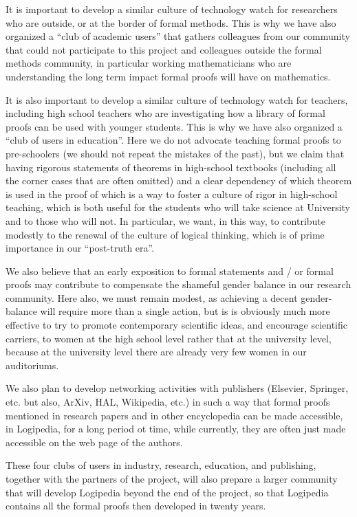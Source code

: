 It is important to develop a similar culture of technology watch for
researchers who are outside, or at the border of formal methods.  This
is why we have also organized a ``club of academic users'' that
gathers colleagues from our community that could not participate to
this project and colleagues outside the formal methods community, in
particular working mathematicians who are understanding the long term
impact formal proofs will have on mathematics.

It is also important to develop a similar culture of technology watch
for teachers, including high school teachers who are investigating how
a library of formal proofs can be used with younger students.  This is
why we have also organized a ``club of users in education''.  Here we
do not advocate teaching formal proofs to pre-schoolers (we should not
repeat the mistakes of the past), but we claim that having rigorous
statements of theorems in high-school textbooks (including all the
corner cases that are often omitted) and a clear dependency of which
theorem is used in the proof of which is a way to foster a culture of
rigor in high-school teaching, which is both useful for the students
who will take science at University and to those who will not. In
particular, we want, in this way, to contribute modestly to the
renewal of the culture of logical thinking, which is of prime
importance in our ``post-truth era''.

We also believe that an early exposition to formal statements and / or
formal proofs may contribute to compensate the shameful gender balance
in our research community. Here also, we must remain modest, as
achieving a decent gender-balance will require more than a single
action, but is is obviously much more effective to try to promote
contemporary scientific ideas, and encourage scientific carriers, to
women at the high school level rather that at the university level,
because at the university level there are already very few women in
our auditoriums.

We also plan to develop networking activities with publishers
(Elsevier, Springer, etc. but also, ArXiv, HAL, Wikipedia, etc.)  in
such a way that formal proofs mentioned in research papers and in
other encyclopedia can be made accessible, in Logipedia, for a long
period ot time, while currently, they are often just made accessible
on the web page of the authors.

These four clubs of users in industry, research, education, and
publishing, together with the partners of the project, will also
prepare a larger community that will develop Logipedia beyond the end
of the project, so that Logipedia contains all the formal proofs then
developed in twenty years.

